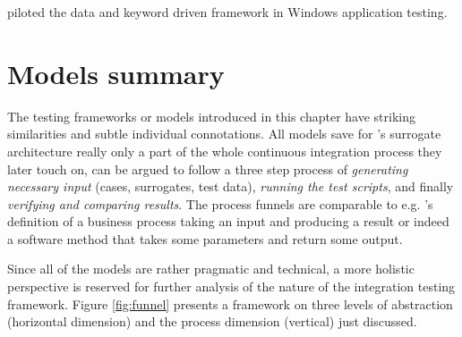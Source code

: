 \documentclass[12pt,a4paper,oneside,pdftex]{report}
\begin{document}
\citet{laukkanen2006data} piloted the data and keyword driven framework in Windows application testing.

\section{Models summary}

The testing frameworks or models introduced in this chapter have striking similarities and subtle individual connotations. All models save for \citeauthor{huang2008surrogate}'s \citeyearpar{huang2008surrogate} surrogate architecture really only a part of the whole continuous integration process they later touch on, can be argued to follow a three step process of \emph{generating necessary input} (cases, surrogates, test data), \emph{running the test scripts}, and finally \emph{verifying and comparing results}. The process funnels are comparable to e.g. \citeauthor{davenport1993process}'s \citeyearpar{davenport1993process} definition of a business process taking an input and producing a result or indeed a software method that takes some parameters and return some output.

Since all of the models are rather pragmatic and technical, a more holistic perspective is reserved for further analysis of the nature of the integration testing framework. Figure \ref{fig:funnel} presents a framework on three levels of abstraction (horizontal dimension) and the process dimension (vertical) just discussed.
\end{document}
